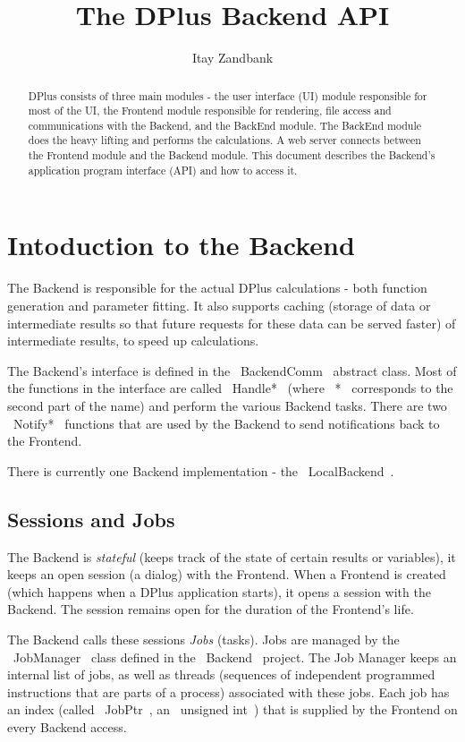 \documentclass[12pt]{article}
\title{The DPlus Backend API}
\author{Itay Zandbank}
\begin{document}
	
\maketitle

\begin{abstract}
DPlus consists of three main modules - the user interface (UI) module responsible for most of the UI, the Frontend module responsible for rendering, file access and communications with the Backend, and the BackEnd module. The BackEnd module does the heavy lifting and performs the calculations. A web server connects between the Frontend module and the Backend module. This document describes the Backend's application program interface (API) and how to access it.
\end{abstract}

\section{Intoduction to the Backend}
The Backend is responsible for the actual DPlus calculations - both function generation and parameter fitting. It also supports caching (storage of data or intermediate results so that future requests for these data can be served faster) of intermediate results, to speed up calculations.

The Backend's interface is defined in the ~BackendComm~ abstract class. Most of the functions in the interface are called ~Handle*~ (where ~*~ corresponds to the second part of the name) and perform the various Backend tasks. There are two ~Notify*~ functions that are used by the Backend to send notifications back to the Frontend.

There is currently one Backend implementation - the ~LocalBackend~.  
 
\subsection{Sessions and Jobs}
The Backend is \emph{stateful} (keeps track of the state of certain results or variables), it keeps an open session (a dialog) with the Frontend. When a Frontend is created (which happens when a DPlus application starts), it opens a session with the Backend. The session remains open for the duration of the Frontend's life.

The Backend calls these sessions \emph{Jobs} (tasks). Jobs are managed by the ~JobManager~ class defined in the ~Backend~ project. The Job Manager keeps an internal list of jobs, as well as threads (sequences of independent programmed instructions that are parts of a process) associated with these jobs. Each job has an index (called ~JobPtr~, an ~unsigned int~) that is supplied by the Frontend on every Backend access.
\end{document}
